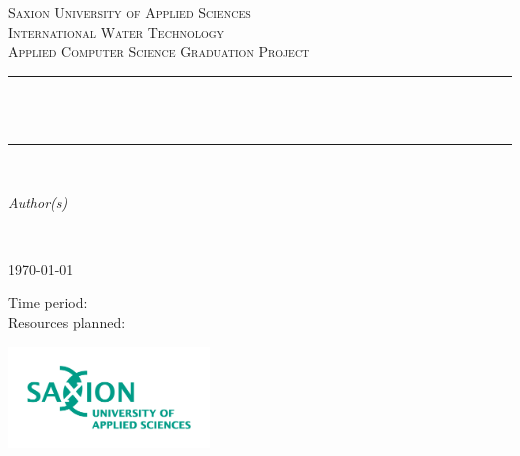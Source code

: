 \begin{titlepage}
  	\newcommand{\HRule}{\rule{\linewidth}{0.3mm}}
	\center
	\textsc{\LARGE Saxion University of Applied Sciences}\\[1.5cm]
	\textsc{\Large International Water Technology}\\[0.5cm]
	\textsc{\large Applied Computer Science Graduation Project}\\[0.5cm]
	\HRule\\[0.4cm]
	{\huge\bfseries \@title}\\[0.4cm]
	\HRule\\[1.5cm]

	\begin{minipage}{0.4\textwidth}
		\begin{flushleft}
			\large
			\textit{Author(s)}\\
			\@author %
		\end{flushleft}
	\end{minipage}
	~
	\begin{minipage}{0.4\textwidth}
		\begin{flushright}
		\end{flushright}
	\end{minipage}
	

	\vfill\vfill
		{\large\today}
    \vfill\vfill
    
    \footnotesize{Time period: \timePeriod}
    \\[0.3cm]
    \footnotesize{Resources planned: \resourcesPlanned}
    \vfill
    \homepage
    
    \vfill
    
    
	
	\vfill\vfill
	\includegraphics[width=0.4\textwidth]{./saxionlogo.png}
	\vfill
	 
	\vfill
	
\end{titlepage}
